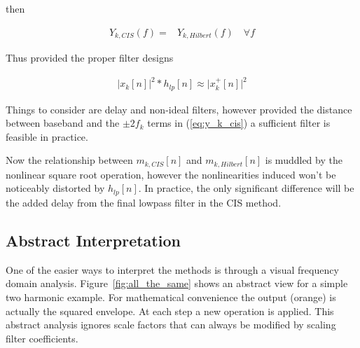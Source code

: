 \documentclass [11pt, proquest,oneside] {ganter_thesis}[2015/03/03]
\begin{document}
then

\begin{align}
Y_{k,CIS}(f) =& Y_{k,Hilbert}(f) \quad \forall f
\end{align}

Thus provided the proper filter designs

\begin{align}
\label{eq:squared_cis_hilbert}
\Big| x_k[n] \Big|^2 * h_{lp}[n] \approx \Big| x^+_k[n] \Big|^2
\end{align}

Things to consider are delay and non-ideal filters, however provided the distance between baseband and the $\pm2f_k$ terms in (\ref{eq:y_k_cis}) a sufficient filter is feasible in practice.

Now the relationship between $m_{k,CIS}[n]$ and $m_{k,Hilbert}[n]$ is muddled by the nonlinear square root operation, however the nonlinearities induced won't be noticeably distorted by $h_{lp}[n]$.  In practice, the only significant difference will be the added delay from the final lowpass filter in the CIS method.

\subsection{Abstract Interpretation}

One of the easier ways to interpret the methods is through a visual frequency domain analysis.  Figure~\ref{fig:all_the_same} shows an abstract view for a simple two harmonic example.  For mathematical convenience the output (orange) is actually the squared envelope.  At each step a new operation is applied.  This abstract analysis ignores scale factors that can always be modified by scaling filter coefficients.
\end{document}
